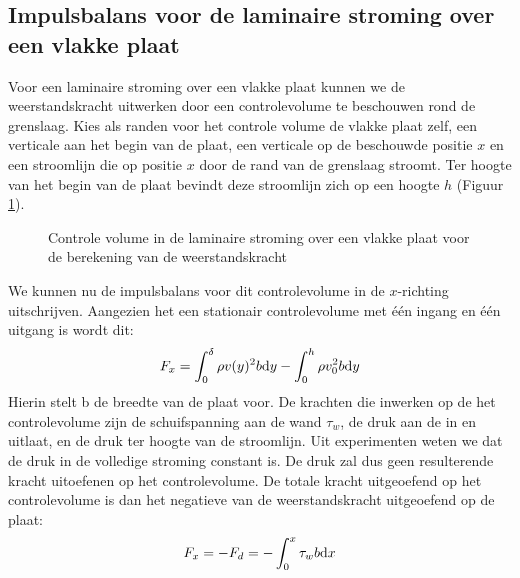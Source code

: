 		\subsection{Impulsbalans voor de laminaire stroming over een vlakke plaat}
		\label{sec:Impulsbalans voor de laminaire stroming over een vlakke plaat}
Voor een laminaire stroming over een vlakke plaat kunnen we de weerstandskracht uitwerken door een controlevolume te beschouwen rond de grenslaag. Kies als randen voor het controle volume de vlakke plaat zelf, een verticale aan het begin van de plaat, een verticale op de beschouwde positie $x$ en een stroomlijn die op positie $x$ door de rand van de grenslaag stroomt. Ter hoogte van het begin van de plaat bevindt deze stroomlijn zich op een hoogte $h$ (Figuur \ref{fig:Laminaire_genslaag_controlevolume}).
\begin{figure}[htb]
	\centering
	
	\caption{Controle volume in de laminaire stroming over een vlakke plaat voor de berekening van de weerstandskracht}
	\label{fig:Laminaire_genslaag_controlevolume}
\end{figure}

We kunnen nu de impulsbalans voor dit controlevolume in de $x$-richting uitschrijven. Aangezien het een stationair controlevolume met één ingang en één uitgang is wordt dit:
\begin{equation}
	F_x = \int_0^{\delta} \rho v(y)^2 b \mathrm{d} y  - \int_0^{h} \rho v_0^2 b \mathrm{d} y
	\label{eqn:laminaire grenslaag impuls}
\end{equation}
Hierin stelt b de breedte van de plaat voor. De krachten die inwerken op de het controlevolume zijn de schuifspanning aan de wand $\tau_w$, de druk aan de in en uitlaat, en de druk ter hoogte van de stroomlijn. Uit experimenten weten we dat de druk in de volledige stroming constant is. De druk zal dus geen resulterende kracht uitoefenen op het controlevolume. De totale kracht uitgeoefend op het controlevolume is dan het negatieve van de weerstandskracht uitgeoefend op de plaat:
\begin{equation}
	F_x = -F_d = -\int_0^x \tau_w b \mathrm{d} x
\end{equation}

